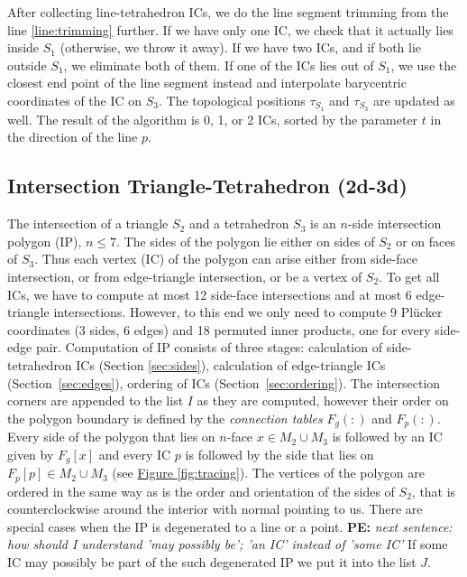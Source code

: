 \documentclass{elsarticle}
\newcommand{\fig}[1]{\hyperref[#1]{Figure \ref{#1}}}
\newcommand{\notePE}[1]{{\color{Orange} \textbf{PE: } \textit{#1}}}
\newcommand{\plucker}{Pl\"{u}cker }
\newcommand{\nface}{$n$-face }
\begin{document}
After collecting line-tetrahedron ICs,
we do the line segment trimming from the line \ref{line:trimming} further. 
If we have only one IC, we check that it actually lies inside $S_1$ (otherwise, we throw it away).
If we have two ICs, and if both lie outside $S_1$, we eliminate both of them. 
If one of the ICs lies out of $S_1$,
we use the closest end point of the line segment instead and interpolate barycentric coordinates of the IC on $S_3$. The topological positions $\tau_{S_1}$ and $\tau_{S_3}$ are updated as well.
The result of the algorithm is 0, 1, or 2 ICs, sorted by the parameter $t$ in the direction of the line $p$.



\subsection{Intersection Triangle-Tetrahedron (2d-3d)}
The intersection of a triangle $S_2$ and a tetrahedron $S_3$ is an $n$-side intersection polygon (IP), $n\le 7$. The sides of the polygon
lie either on sides of $S_2$ or on faces of $S_3$. Thus each vertex (IC) of the polygon
can arise either from side-face intersection, or from edge-triangle intersection, or be a vertex of $S_2$.
To get all ICs, we have to compute at most 12 side-face intersections and at most 6 edge-triangle intersections. However,
to this end we only need to compute 9 \plucker coordinates (3 sides, 6 edges) and 18 permuted inner products, one for every side-edge pair.
Computation of IP consists of three stages: calculation of side-tetrahedron ICs (Section \ref{sec:sides}), 
calculation of edge-triangle ICs (Section~\ref{sec:edges}), ordering of ICs (Section~\ref{sec:ordering}).
The intersection corners are appended to the list $I$ as they are computed, however their order on the polygon boundary is 
defined by the \emph{connection tables} $F_g(:)$ and $F_p(:)$. Every side of the polygon that lies on \nface $x\in M_2\cup M_3$ is followed by an IC given by $F_g[x]$ 
and every IC $p$ is followed by the side that lies on $F_p[p]\in M_2\cup M_3$ (see \fig{fig:tracing}). The vertices of the polygon are ordered in the same 
way as is the order and orientation of the sides of $S_2$, that is counterclockwise around the interior with normal pointing to us.
There are special cases when the IP is degenerated to a line or a point. 
\notePE{next sentence: how should I understand 'may possibly be'; 'an IC' instead of 'some IC'}
If some IC may possibly be part of the such degenerated IP we put it into the list $J$. 
\end{document}
